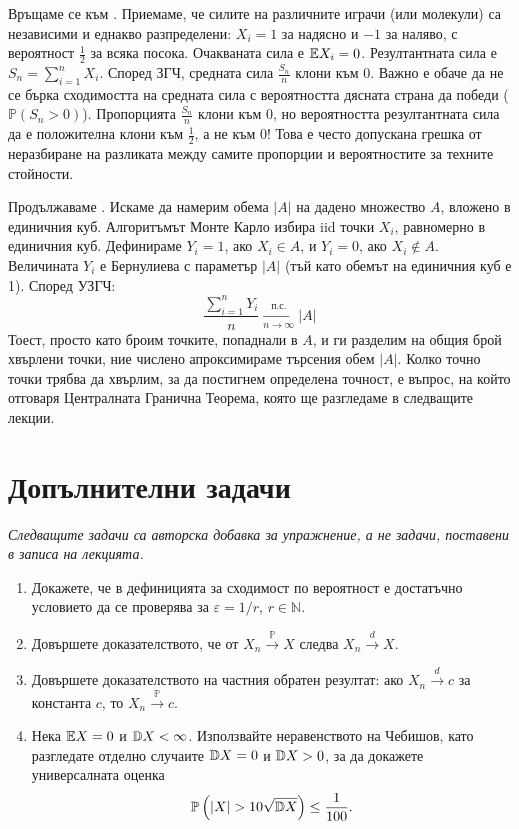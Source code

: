 \begin{example}\label{ex:10-5}\label{ex:tug-of-war}
Връщаме се към . Приемаме, че силите на различните играчи (или молекули) са независими и еднакво разпределени: $X_i=1$ за надясно и $-1$ за наляво, с вероятност $\frac{1}{2}$ за всяка посока. Очакваната сила е $\mathbb{E} X_i = 0$. Резултантната сила е $S_n = \sum_{i=1}^n X_i$. Според ЗГЧ, средната сила $\frac{S_n}{n}$ клони към 0. Важно е обаче да не се бърка сходимостта на средната сила с вероятността дясната страна да победи ($\mathbb{P}(S_n > 0)$). Пропорцията $\frac{S_n}{n}$ клони към 0, но вероятността резултантната сила да е положителна клони към $\frac{1}{2}$, а не към 0! Това е често допускана грешка от неразбиране на разликата между самите пропорции и вероятностите за техните стойности.
\end{example}

\begin{example}\label{ex:10-6}\label{ex:monte-carlo}
Продължаваме . Искаме да намерим обема $|A|$ на дадено множество $A$, вложено в единичния куб. Алгоритъмът Монте Карло избира iid точки $X_i$, равномерно в единичния куб. Дефинираме $Y_i = 1$, ако $X_i \in A$, и $Y_i = 0$, ако $X_i \notin A$. Величината $Y_i$ е Бернулиева с параметър $|A|$ (тъй като обемът на единичния куб е 1). Според УЗГЧ:
\[
\frac{\sum_{i=1}^n Y_i}{n} \xrightarrow[n \to \infty]{\text{п.с.}} |A|
\]
Тоест, просто като броим точките, попаднали в $A$, и ги разделим на общия брой хвърлени точки, ние числено апроксимираме търсения обем $|A|$. Колко точно точки трябва да хвърлим, за да постигнем определена точност, е въпрос, на който отговаря Централната Гранична Теорема, която ще разгледаме в следващите лекции.
\end{example}

\section{Допълнителни задачи}
\emph{Следващите задачи са авторска добавка за упражнение, а не задачи, поставени в записа на лекцията.}

\begin{enumerate}
    \item Докажете, че в дефиницията за сходимост по вероятност е достатъчно условието да се проверява за $\varepsilon=1/r$, $r\in\mathbb{N}$.
    \item Довършете доказателството, че от $X_n\xrightarrow{\mathbb{P}}X$ следва $X_n\xrightarrow{d}X$.
    \item Довършете доказателството на частния обратен резултат: ако $X_n\xrightarrow{d}c$ за константа $c$, то $X_n\xrightarrow{\mathbb{P}}c$.
    \item Нека $\mathbb{E} X=0$ и $\mathbb{D} X<\infty$. Използвайте неравенството на Чебишов, като разгледате отделно случаите $\mathbb{D} X=0$ и $\mathbb{D} X>0$, за да докажете универсалната оценка
    \[
    \mathbb{P}\left(|X|>10\sqrt{\Var X}\right)\le\frac{1}{100}.
    \]
\end{enumerate}
